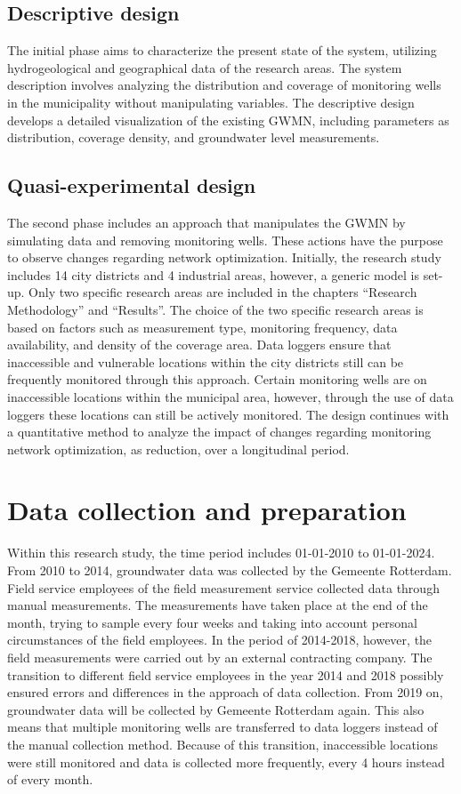 \subsection{Descriptive design}
The initial phase aims to characterize the present state of the system, utilizing hydrogeological and geographical data of the research areas. The system description involves analyzing the distribution and coverage of monitoring wells in the municipality without manipulating variables. The descriptive design develops a detailed visualization of the existing GWMN, including parameters as distribution, coverage density, and groundwater level measurements.

\subsection{Quasi-experimental design}
The second phase includes an approach that manipulates the GWMN by simulating data and removing monitoring wells. These actions have the purpose to observe changes regarding network optimization. Initially, the research study includes 14 city districts and 4 industrial areas, however, a generic model is set-up. Only two specific research areas are included in the chapters “Research Methodology” and “Results”. The choice of the two specific research areas is based on factors such as measurement type, monitoring frequency, data availability, and density of the coverage area. Data loggers ensure that inaccessible and vulnerable locations within the city districts still can be frequently monitored through this approach. Certain monitoring wells are on inaccessible locations within the municipal area, however, through the use of data loggers these locations can still be actively monitored. The design continues with a quantitative method to analyze the impact of changes regarding monitoring network optimization, as reduction, over a longitudinal period.

\section{Data collection and preparation}
Within this research study, the time period includes 01-01-2010 to 01-01-2024. From 2010 to 2014, groundwater data was collected by the Gemeente Rotterdam. Field service employees of the field measurement service collected data through manual measurements. The measurements have taken place at the end of the month, trying to sample every four weeks and taking into account personal circumstances of the field employees. In the period of 2014-2018, however, the field measurements were carried out by an external contracting company. The transition to different field service employees in the year 2014 and 2018 possibly ensured errors and differences in the approach of data collection. From 2019 on, groundwater data will be collected by Gemeente Rotterdam again. This also means that multiple monitoring wells are transferred to data loggers instead of the manual collection method. Because of this transition, inaccessible locations were still monitored and data is collected more frequently, every 4 hours instead of every month.
